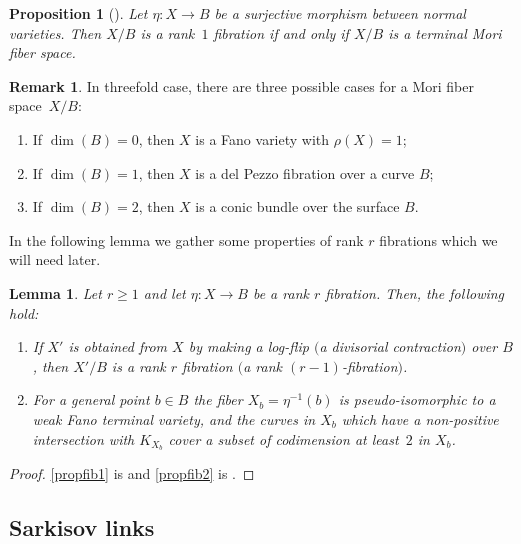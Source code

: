 \documentclass[JEP,XML,SOM,Unicode,NoFloatCountersInSection]{cedram}
\theoremstyle{plain}
\newtheorem{lem}[thm]{Lemma}
\newtheorem{prop}[thm]{Proposition}
\theoremstyle{definition}
\newtheorem{rem}[thm]{Remark}
\begin{document}
\begin{prop}[{\cite[Lem.\,3.3]{BLZ}}]
Let $\eta: X\to B$ be a surjective morphism between normal varieties. Then $X/B$ is a rank~$1$ fibration if and only if $X/B$ is a terminal Mori fiber space.
\end{prop}
\begin{rem}
In threefold case, there are three possible cases for a Mori fiber space~$X/B$:
\begin{enumerate}
\item If $\dim(B)=0$, then $X$ is a Fano variety with $\rho(X)=1$;
\item If $\dim(B)=1$, then $X$ is a del Pezzo fibration over a curve $B$;
\item If $\dim(B)=2$, then $X$ is a conic bundle over the surface $B$.
\end{enumerate}
\end{rem}

In the following lemma we gather some properties of rank $r$ fibrations which we will need later.

\begin{lem}\label{lem: prop of fibrations}
Let $r\ge 1$ and let $\eta: X\to B$ be a rank $r$ fibration. Then, the following hold:
\begin{enumerate}
\item\label{propfib1} If $X'$ is obtained from $X$ by making a log-flip $($\resp a divisorial contraction$)$ over $B$, then $X'/B$ is a rank $r$ fibration $($\resp a rank $(r-1)$-fibration$)$.
\item\label{propfib2} For a general point $b\in B$ the fiber $X_b=\eta^{-1}(b)$ is pseudo-isomorphic to a weak Fano terminal variety, and the curves in $X_b$ which have a non-positive intersection with $K_{X_b}$ cover a subset of codimension at least~$2$ in $X_b$.
\end{enumerate}
\end{lem}
\begin{proof}
\eqref{propfib1} is \cite[Lem.\,3.4(1)]{BLZ} and \eqref{propfib2} is \cite[Cor.\,3.6]{BLZ}.
\end{proof}

\subsection{Sarkisov links}\label{Sec:SarkisovLinks}
\end{document}
